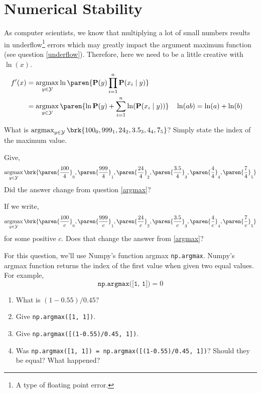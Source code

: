 \documentclass{homework}
\renewcommand\P{\mathbf{P}}
\newcommand\Y{\mathcal{Y}}
\DeclareMathOperator*{\argmax}{argmax}
\begin{document}
\section{Numerical Stability}
As computer scientists, we know that multiplying a lot of small numbers results in underflow\footnote{A type of floating point error.} errors which may greatly impact the argument maximum function (see question \ref{underflow}). Therefore, here we need to be a little creative with $\ln(x)$.
\begin{align*}
  f'(x) & = \argmax_{y\in \Y}\ln\paren{\P(y)\prod_{i=1}^n\P(x_i \mid y)}                                    \\
        & = \argmax_{y\in \Y}\paren{\ln \P(y) + \sum_{i=1}^n\ln(\P(x_i \mid y))} &  & \ln(ab) = \ln(a) + \ln(b) \\
\end{align*}

\question\label{argmax} What is $\argmax_{y\in \Y} \brk{100_0, 999_1, 24_2, 3.5_3, 4_4, 7_5}$? Simply state the index of the maximum value.

\question\label{argmax1} Give,
\[
  \argmax_{y\in \Y} \brk{\paren{\frac{100}{4}}_0, \paren{\frac{999}{4}}_1, \paren{\frac{24}{4}}_2, \paren{\frac{3.5}{4}}_3, \paren{\frac{4}{4}}_4, \paren{\frac{7}{4}}_5}
\]
Did the answer change from question \ref{argmax}?

\question\label{argmax2} If we write,
\[
  \argmax_{y\in \Y} \brk{\paren{\frac{100}{c}}_0, \paren{\frac{999}{c}}_1, \paren{\frac{24}{c}}_2, \paren{\frac{3.5}{c}}_3, \paren{\frac{4}{c}}_4, \paren{\frac{7}{c}}_5}
\]
for some positive $c$. Does that change the answer from \ref{argmax}?

\question\label{underflow} For this question, we'll use Numpy's function argmax \eg \texttt{np.argmax}. Numpy's argmax function returns the index of the first value when given two equal values. For example,
\[
  \texttt{np.argmax([1, 1])} = 0
\]
\begin{enumerate}
  \item What is $(1-0.55)/0.45$?
  \item Give \texttt{np.argmax([1, 1])}.
  \item Give \texttt{np.argmax([(1-0.55)/0.45, 1])}.
  \item Was \texttt{np.argmax([1, 1]) = np.argmax([(1-0.55)/0.45, 1])}? Should they be equal? What happened?
\end{enumerate}
\end{document}

